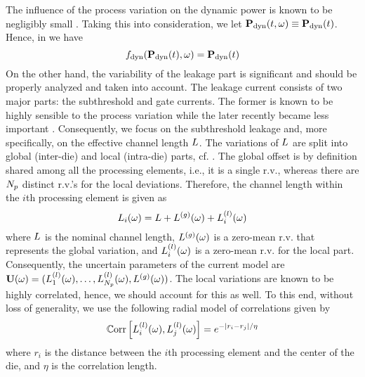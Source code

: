 The influence of the process variation on the dynamic power is known to be negligibly small \cite{juan2012, srivastava2010}. Taking this into consideration, we let $\mathbf{P}_{\text{dyn}}(t, \omega) \equiv \mathbf{P}_{\text{dyn}}(t)$. Hence, in  we have
\[
  f_{\text{dyn}}(\mathbf{P}_{\text{dyn}}(t), \omega) = \mathbf{P}_{\text{dyn}}(t)
\]
On the other hand, the variability of the leakage part is significant and should be properly analyzed and taken into account. The leakage current consists of two major parts: the subthreshold and gate currents. The former is known to be highly sensible to the process variation while the later recently became less important \cite{juan2012}. Consequently, we focus on the subthreshold leakage and, more specifically, on the effective channel length $L$. The variations of $L$ are split into global (inter-die) and local (intra-die) parts, cf. \cite{juan2012, srivastava2010, shen2009}. The global offset is by definition shared among all the processing elements, i.e., it is a single r.v., whereas there are ${N_p}$ distinct r.v.'s for the local deviations. Therefore, the channel length within the $i$th processing element is given as
\[
  L_i(\omega) = L + {L^{(g)}}(\omega) + L^{(l)}_i(\omega)
\]
where $L$ is the nominal channel length, ${L^{(g)}}(\omega)$ is a zero-mean r.v. that represents the global variation, and $L^{(l)}_i(\omega)$ is a zero-mean r.v. for the local part. Consequently, the uncertain parameters of the current model are $\mathbf{U}(\omega) = (L^{(l)}_1(\omega), \dotsc, L^{(l)}_{N_p}(\omega), {L^{(g)}}(\omega) )$. The local variations are known to be highly correlated, hence, we should account for this as well. To this end, without loss of generality, we use the following radial model of correlations \cite{ghanem1991} given by
\begin{equation} \elabel{covariance}
  \oCorr{\lLeff_i(\o), \lLeff_j(\o)} = e^{-|r_i - r_j|/\eta}
\end{equation}
where $r_i$ is the distance between the $i$th processing element and the center of the die, and $\eta$ is the correlation length.

